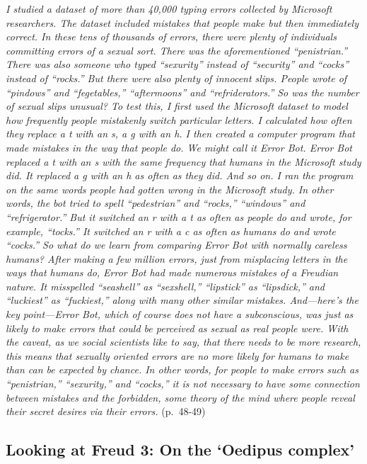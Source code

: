 \documentclass[]{book}
\theoremstyle{definition}
\theoremstyle{definition}
\theoremstyle{definition}
\theoremstyle{remark}
\begin{document}
\emph{I studied a dataset of more than 40,000 typing errors collected by
Microsoft researchers. The dataset included mistakes that people make
but then immediately correct. In these tens of thousands of errors,
there were plenty of individuals committing errors of a sexual sort.
There was the aforementioned ``penistrian.'' There was also someone who
typed ``sexurity'' instead of ``security'' and ``cocks'' instead of
``rocks.'' But there were also plenty of innocent slips. People wrote of
``pindows'' and ``fegetables,'' ``aftermoons'' and ``refriderators.'' So
was the number of sexual slips unusual? To test this, I first used the
Microsoft dataset to model how frequently people mistakenly switch
particular letters. I calculated how often they replace a t with an s, a
g with an h. I then created a computer program that made mistakes in the
way that people do. We might call it Error Bot. Error Bot replaced a t
with an s with the same frequency that humans in the Microsoft study
did. It replaced a g with an h as often as they did. And so on. I ran
the program on the same words people had gotten wrong in the Microsoft
study. In other words, the bot tried to spell ``pedestrian'' and
``rocks,'' ``windows'' and ``refrigerator.'' But it switched an r with a
t as often as people do and wrote, for example, ``tocks.'' It switched
an r with a c as often as humans do and wrote ``cocks.'' So what do we
learn from comparing Error Bot with normally careless humans? After
making a few million errors, just from misplacing letters in the ways
that humans do, Error Bot had made numerous mistakes of a Freudian
nature. It misspelled ``seashell'' as ``sexshell,'' ``lipstick'' as
``lipsdick,'' and ``luckiest'' as ``fuckiest,'' along with many other
similar mistakes. And---here's the key point---Error Bot, which of
course does not have a subconscious, was just as likely to make errors
that could be perceived as sexual as real people were. With the caveat,
as we social scientists like to say, that there needs to be more
research, this means that sexually oriented errors are no more likely
for humans to make than can be expected by chance. In other words, for
people to make errors such as ``penistrian,'' ``sexurity,'' and
``cocks,'' it is not necessary to have some connection between mistakes
and the forbidden, some theory of the mind where people reveal their
secret desires via their errors.} (p.~48-49)

\subsection{\texorpdfstring{Looking at Freud 3: On the `Oedipus
complex'}{Looking at Freud 3: On the Oedipus complex}}\label{looking-at-freud-3-on-the-oedipus-complex}
\end{document}
